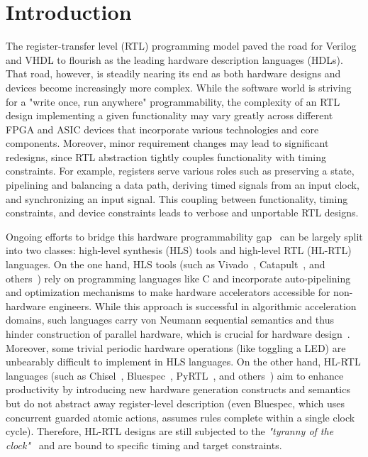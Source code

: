\section{Introduction}
The register-transfer level (RTL) programming model paved the road for Verilog and VHDL to flourish as the leading hardware description languages (HDLs). That road, however, is steadily nearing its end as both hardware designs and devices become increasingly more complex. While the software world is striving for a "write once, run anywhere" programmability, the complexity of an RTL design implementing a given functionality may vary greatly across different FPGA and ASIC devices that incorporate various technologies and core components. Moreover, minor requirement changes may lead to significant redesigns, since RTL abstraction tightly couples functionality with timing constraints. For example, registers serve various roles such as preserving a state, pipelining and balancing a data path, deriving timed signals from an input clock, and synchronizing an input signal. This coupling between functionality, timing constraints, and device constraints leads to verbose and unportable RTL designs. 

Ongoing efforts to bridge this hardware programmability gap~\cite{Kapre2016, Nane2016, Windh2015} can be largely split into two classes: high-level synthesis (HLS) tools and high-level RTL (HL-RTL) languages.
On the one hand, HLS tools (such as Vivado~\cite{Vivado2012}, Catapult~\cite{graphics2008catapult}, and others~\cite{Kavvadias2013, synphony2015}) rely on programming languages like C and incorporate auto-pipelining and optimization mechanisms to make hardware accelerators accessible for non-hardware engineers. While this approach is successful in algorithmic acceleration domains, such languages carry von Neumann sequential semantics and thus hinder construction of parallel hardware, which is crucial for hardware design~\cite{Zhao2017}. Moreover, some trivial periodic hardware operations (like toggling a LED) are unbearably difficult to implement in HLS languages.
On the other hand, HL-RTL languages (such as Chisel~\cite{Bachrach2012}, Bluespec~\cite{nikhil2004bluespec}, PyRTL~\cite{Clow2017}, and others~\cite{Charles2016, Liu2017, jiang2018mamba, decaluwe2004myhdl, CxLang2014, Lockhart2014}) aim to enhance productivity by introducing new hardware generation constructs and semantics but do not abstract away register-level description (even Bluespec, which uses concurrent guarded atomic actions, assumes rules complete within a single clock cycle). Therefore, HL-RTL designs are still subjected to the \emph{"tyranny of the clock"}~\cite{Sutherland2012} and are bound to specific timing and target constraints.

